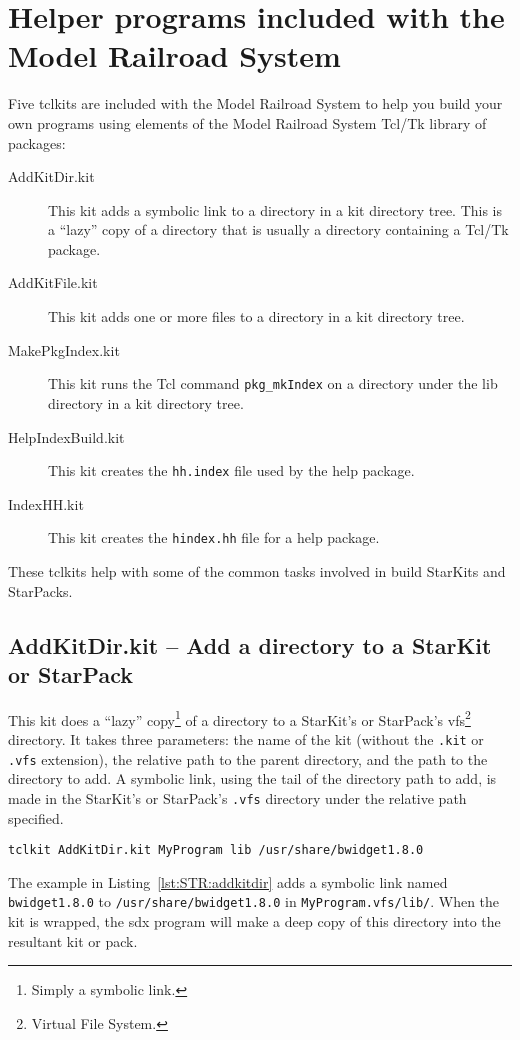 \section{Helper programs included with the Model Railroad System}

Five tclkits are included with the Model Railroad System to help you
build your own programs using elements of the Model Railroad System
Tcl/Tk library of packages:
\begin{description}
\item[AddKitDir.kit] This kit adds a symbolic link to a directory in a
kit directory tree.  This is a ``lazy'' copy of a directory that is usually a
directory containing a Tcl/Tk package.
\item[AddKitFile.kit] This kit adds one or more files to a directory in
a kit directory tree.
\item[MakePkgIndex.kit] This kit runs the Tcl command
\lstinline=pkg_mkIndex= on a directory under the lib directory in a kit
directory tree.
\item[HelpIndexBuild.kit] This kit creates the \lstinline=hh.index= file
used by the help package.
\item[IndexHH.kit] This kit creates the \lstinline=hindex.hh= file for a
help package.
\end{description}
These tclkits help with some of the common tasks involved in build
StarKits and StarPacks.

\subsection{AddKitDir.kit -- Add a directory to a StarKit or StarPack}

This kit does a ``lazy'' copy\footnote{Simply a symbolic link.} of a
directory to a StarKit's or StarPack's vfs\footnote{Virtual File System.}
directory.  It takes three parameters: the name of the kit (without the
\lstinline=.kit= or \lstinline=.vfs= extension), the relative path to
the parent directory, and the path to the directory to add.  A symbolic link,
using the tail of the directory path to add, is made in the StarKit's or
StarPack's \lstinline=.vfs= directory under the relative path specified.

\begin{lstlisting}[label={lst:STR:addkitdir},caption={Adding a directory
to a kit.}]
tclkit AddKitDir.kit MyProgram lib /usr/share/bwidget1.8.0
\end{lstlisting}

The example in Listing~\ref{lst:STR:addkitdir} adds a symbolic link
named \lstinline=bwidget1.8.0= to \lstinline=/usr/share/bwidget1.8.0= in
\lstinline=MyProgram.vfs/lib/=. When the kit is wrapped, the sdx program
will make a deep copy of this directory into the resultant kit or pack.

